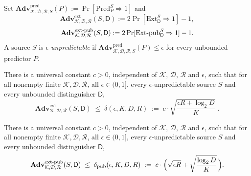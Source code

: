\documentclass{conjura-conjecture}
\newcommand{\Adv}{\mathbf{Adv}}
\newcommand{\Pred}{\mathrm{Pred}}
\newcommand{\Ext}{\mathrm{Ext}}
\newcommand{\ExtP}{\mathrm{Ext}\text{-}\mathrm{pub}}
\newcommand{\pred}{\mathrm{pred}}
\newcommand{\ext}{\mathrm{ext}}
\newcommand{\extpub}{\textup{ext-pub}}
\newcommand{\calK}{\mathcal{K}}
\newcommand{\calD}{\mathcal{D}}
\newcommand{\calR}{\mathcal{R}}
\begin{document}
\begin{definition}\label{def:games}
Set $\Adv^{\pred}_{\calK,\calD,\calR,S}(P) := \Pr[\Pred^{S}_{P} \Rightarrow 1]$ and
\[
  \Adv^{\ext}_{\calK,\calD,\calR}(S,\mathsf{D}) := 2\Pr[\Ext^{S}_{\mathsf{D}} \Rightarrow 1] - 1 ,
\]
\[
  \Adv^{\extpub}_{\calK,\calD,\calR}(S,\mathsf{D}) := 2\Pr[\ExtP^{S}_{\mathsf{D}} \Rightarrow 1] - 1 .
\]
A source $S$ is \emph{$\epsilon$-unpredictable} if
$\Adv^{\pred}_{\calK,\calD,\calR,S}(P) \le \epsilon$ for every unbounded predictor $P$.
\end{definition}

\begin{conjecture}\label{conj:main}
There is a universal constant $c > 0$, independent of $\calK$, $\calD$, $\calR$ and $\epsilon$, such
that for all nonempty finite $\calK, \calD, \calR$, all $\epsilon \in (0,1]$, every
$\epsilon$-unpredictable source $S$ and every unbounded distinguisher $\mathsf{D}$,
\[
  \Adv^{\ext}_{\calK,\calD,\calR}(S,\mathsf{D})
  \;\le\; \delta(\epsilon, K, D, R)
  \;:=\; c \cdot \sqrt{\frac{\epsilon R + \log_2 D}{K}} \; .
\]
\end{conjecture}

\begin{conjecture}\label{conj:pub}
There is a universal constant $c > 0$, independent of $\calK$, $\calD$, $\calR$ and $\epsilon$, such
that for all nonempty finite $\calK, \calD, \calR$, all $\epsilon \in (0,1]$, every
$\epsilon$-unpredictable source $S$ and every unbounded distinguisher $\mathsf{D}$,
\[
  \Adv^{\extpub}_{\calK,\calD,\calR}(S,\mathsf{D})
  \;\le\; \delta_{\mathrm{pub}}(\epsilon, K, D, R)
  \;:=\; c \cdot \Bigl( \sqrt{\epsilon R} + \sqrt{\frac{\log_2 D}{K}} \,\Bigr) .
\]
\end{conjecture}
\end{document}

